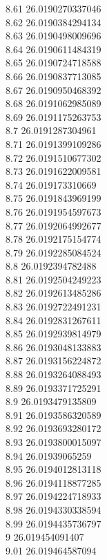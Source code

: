 {8.61	26.0190270337046\\
8.62	26.0190384294134\\
8.63	26.0190498009696\\
8.64	26.0190611484319\\
8.65	26.0190724718588\\
8.66	26.0190837713085\\
8.67	26.0190950468392\\
8.68	26.0191062985089\\
8.69	26.0191175263753\\
8.7	26.0191287304961\\
8.71	26.0191399109286\\
8.72	26.0191510677302\\
8.73	26.0191622009581\\
8.74	26.019173310669\\
8.75	26.0191843969199\\
8.76	26.0191954597673\\
8.77	26.0192064992677\\
8.78	26.0192175154774\\
8.79	26.0192285084524\\
8.8	26.0192394782488\\
8.81	26.0192504249223\\
8.82	26.0192613485286\\
8.83	26.0192722491231\\
8.84	26.0192831267611\\
8.85	26.0192939814979\\
8.86	26.0193048133883\\
8.87	26.0193156224872\\
8.88	26.0193264088493\\
8.89	26.0193371725291\\
8.9	26.0193479135809\\
8.91	26.0193586320589\\
8.92	26.0193693280172\\
8.93	26.0193800015097\\
8.94	26.01939065259\\
8.95	26.0194012813118\\
8.96	26.0194118877285\\
8.97	26.0194224718933\\
8.98	26.0194330338594\\
8.99	26.0194435736797\\
9	26.019454091407\\
9.01	26.019464587094\\
}
